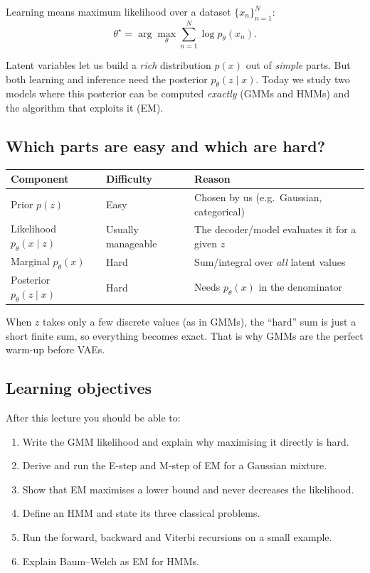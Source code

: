 \documentclass[11pt,a4paper]{article}
\begin{document}
Learning means maximum likelihood over a dataset $\{x_n\}_{n=1}^N$:
\[
\theta^\star=\arg\max_\theta \sum_{n=1}^N \log p_\theta(x_n).
\]

\begin{keyidea}
Latent variables let us build a \emph{rich} distribution $p(x)$ out of \emph{simple} parts. But both learning and inference need the posterior $p_\theta(z\mid x)$. Today we study two models where this posterior can be computed \emph{exactly} (GMMs and HMMs) and the algorithm that exploits it (EM).
\end{keyidea}

\subsection{Which parts are easy and which are hard?}

\begin{center}
\begin{tabular}{@{}lll@{}}
\toprule
Component & Difficulty & Reason\\
\midrule
Prior $p(z)$ & Easy & Chosen by us (e.g.\ Gaussian, categorical)\\
Likelihood $p_\theta(x\mid z)$ & Usually manageable & The decoder/model evaluates it for a given $z$\\
Marginal $p_\theta(x)$ & Hard & Sum/integral over \emph{all} latent values\\
Posterior $p_\theta(z\mid x)$ & Hard & Needs $p_\theta(x)$ in the denominator\\
\bottomrule
\end{tabular}
\end{center}

When $z$ takes only a few discrete values (as in GMMs), the ``hard'' sum is just a short finite sum, so everything becomes exact. That is why GMMs are the perfect warm-up before VAEs.

\subsection{Learning objectives}
After this lecture you should be able to:
\begin{enumerate}[nosep]
\item Write the GMM likelihood and explain why maximising it directly is hard.
\item Derive and run the E-step and M-step of EM for a Gaussian mixture.
\item Show that EM maximises a lower bound and never decreases the likelihood.
\item Define an HMM and state its three classical problems.
\item Run the forward, backward and Viterbi recursions on a small example.
\item Explain Baum--Welch as EM for HMMs.
\end{enumerate}
\end{document}
